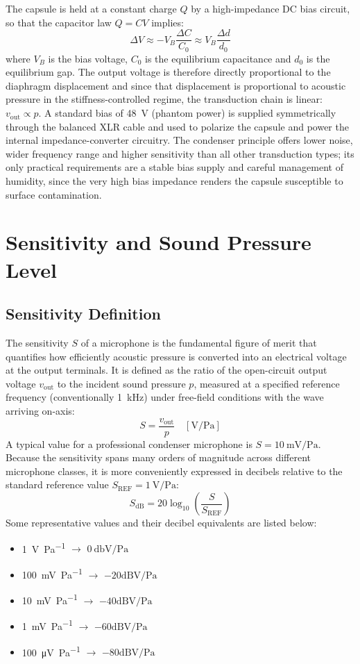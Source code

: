 The capsule is held at a constant charge \(Q\) by a high-impedance DC bias circuit, so that the capacitor law \(Q = C V\) implies:
\[
\Delta V \approx -V_B \frac{\Delta C}{C_0} \approx V_B \frac{\Delta d}{d_0}
\]
where \(V_B\) is the bias voltage, \(C_0\) is the equilibrium capacitance and \(d_0\) is the equilibrium gap.
The output voltage is therefore directly proportional to the diaphragm displacement and since that displacement is proportional to acoustic pressure in the stiffness-controlled regime, the transduction chain is linear: \(v_{\mathrm{out}} \propto p\).
A standard bias of \SI{48}{\volt} (phantom power) is supplied symmetrically through the balanced XLR cable and used to polarize the capsule and power the internal impedance-converter circuitry.
The condenser principle offers lower noise, wider frequency range and higher sensitivity than all other transduction types; its only practical requirements are a stable bias supply and careful management of humidity, since the very high bias impedance renders the capsule susceptible to surface contamination.

\section{Sensitivity and Sound Pressure Level}
\label{sc:112}

\subsection{Sensitivity Definition}

The sensitivity \(S\) of a microphone is the fundamental figure of merit that quantifies how efficiently acoustic pressure is converted into an electrical voltage at the output terminals.
It is defined as the ratio of the open-circuit output voltage \(v_{\mathrm{out}}\) to the incident sound pressure \(p\), measured at a specified reference frequency (conventionally \SI{1}{\kilo\hertz}) under free-field conditions with the wave arriving on-axis:
\[
S = \frac{v_{\mathrm{out}}}{p} \quad \left[\si{\volt\per\pascal}\right]
\]
A typical value for a professional condenser microphone is \(S = \SI{10}{\milli\volt\per\pascal}\).
Because the sensitivity spans many orders of magnitude across different microphone classes, it is more conveniently expressed in decibels relative to the standard reference value \(S_{\mathrm{REF}} = \SI{1}{\volt\per\pascal}\):
\[
S_{\mathrm{dB}} = 20\log_{10}\left(\frac{S}{S_{\mathrm{REF}}}\right)
\]
Some representative values and their decibel equivalents are listed below:
\begin{itemize}
    \item \SI{1}{\volt\per\pascal} \(\to\) \(\SI{0}{\decibel} \mathrm{V/Pa}\)
    \item \SI{100}{\milli\volt\per\pascal} \(\to\) \(-20 \mathrm{dB} \mathrm{V/Pa}\)
    \item \SI{10}{\milli\volt\per\pascal} \(\to\) \(-40 \mathrm{dB} \mathrm{V/Pa}\)
    \item \SI{1}{\milli\volt\per\pascal} \(\to\) \(-60 \mathrm{dB} \mathrm{V/Pa}\)
    \item \SI{100}{\micro\volt\per\pascal} \(\to\) \(-80 \mathrm{dB} \mathrm{V/Pa}\)
\end{itemize}

